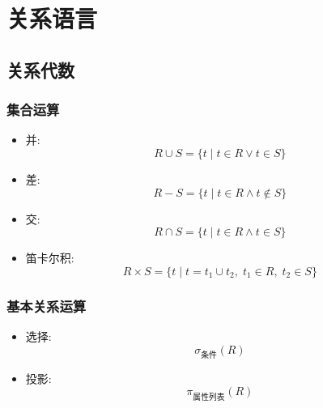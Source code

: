 \section{关系语言}
\subsection{关系代数}

\subsubsection{集合运算}
\begin{itemize}
    \item 并: 
    \[
    R \cup S = \{t \mid t \in R \vee t \in S\}
    \]
    \item 差: 
    \[
    R - S = \{t \mid t \in R \wedge t \notin S\}
    \]
    \item 交: 
    \[
    R \cap S = \{t \mid t \in R \wedge t \in S\}
    \]
    \item 笛卡尔积: 
    \[
    R \times S = \{t \mid t = t_1 \cup t_2,\; t_1 \in R,\; t_2 \in S\}
    \]
\end{itemize}

\subsubsection{基本关系运算}
\begin{itemize}
    \item 选择:
    \[
    \sigma_{\text{条件}}(R)
    \]
    \item 投影:
    \[
    \pi_{\text{属性列表}}(R)
    \]
\end{itemize}

